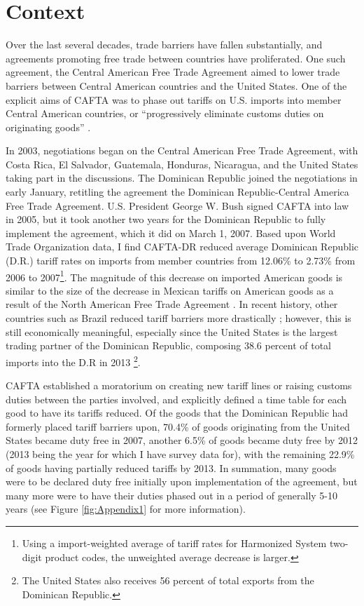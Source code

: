 \documentclass[12pt]{article}
\begin{document}
\vspace{-10pt}
\section{Context}
\label{sec:Context}
Over the last several decades, trade barriers have fallen substantially, and agreements promoting
free trade between countries have proliferated. One such agreement, the Central American Free Trade 
Agreement aimed to lower trade barriers between Central American countries and 
the United States. One of the explicit aims of CAFTA was to phase out tariffs on U.S. 
imports into member Central American countries, or ``progressively eliminate customs duties on 
originating goods'' \citep{ustraderep}.

In 2003, negotiations began on the Central American Free Trade Agreement, with Costa Rica, El 
Salvador, Guatemala, Honduras, Nicaragua, and the United States taking part in the discussions. The 
Dominican Republic joined the negotiations in early January, retitling the agreement the Dominican 
Republic-Central America Free Trade Agreement. U.S. President George W. 
Bush signed CAFTA into law in 2005, but it took another two years for the 
Dominican Republic to fully implement the agreement, which it did on March 1, 2007.
Based upon World Trade Organization data,
I find CAFTA-DR reduced average Dominican 
Republic (D.R.) tariff rates on imports from member countries from 12.06\% to 2.73\% from 2006 to 
2007\footnote{Using a import-weighted average
of tariff rates for Harmonized System two-digit product codes, 
the unweighted average decrease is larger.}. The magnitude of this decrease on imported American
goods is similar to the size of the decrease in Mexican tariffs on American goods as a result of the
North American Free Trade Agreement \citep{goldberg}. 
In recent history, other countries such as Brazil reduced tariff barriers more drastically
\citep{kovak}; however, this is still economically meaningful, especially since the United States 
is the largest trading partner of the Dominican Republic, composing 
38.6 percent of  total imports into the D.R in 2013 \citep{wtocountry}\footnote{The 
United States also receives 56 percent of total exports from the Dominican Republic.}.

CAFTA established a moratorium on creating new tariff lines or raising customs 
duties between the parties involved, and explicitly defined a time table for each good to have its 
tariffs reduced. Of the goods that the Dominican Republic had formerly placed tariff barriers upon,
70.4\% of goods originating from the United States became duty free in 2007, another 6.5\%
of goods became duty free by 2012 (2013 being the year for which I have survey data for), with
the remaining 22.9\% of goods having partially reduced tariffs by 2013.
In summation, many goods were to be declared duty free initially upon implementation of the agreement, 
but many more were to have their duties phased out in a period of generally 5-10 years 
(see Figure \ref{fig:Appendix1} for more information). 
\end{document}
